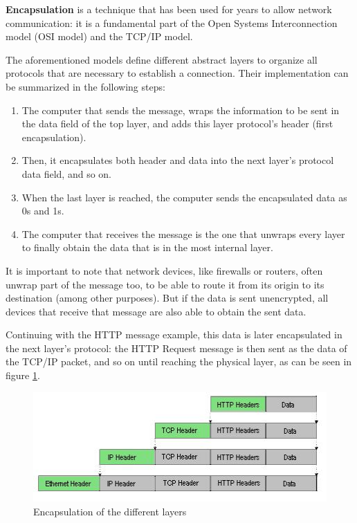 \textbf{Encapsulation} is a technique that has been used for years to allow network communication: it is a fundamental part of the Open Systems Interconnection model (OSI model) and the TCP/IP model. 

The aforementioned models define different abstract layers to organize all protocols that are necessary to establish a connection. Their implementation can be summarized in the following steps:
\begin{enumerate}
\item The computer that sends the message, wraps the information to be sent in the data field of the top layer, and adds this layer protocol's header (first encapsulation). 
\item Then, it encapsulates both header and data into the next layer's protocol data field, and so on. 
\item When the last layer is reached, the computer sends the encapsulated data as 0s and 1s.
\item The computer that receives the message is the one that unwraps every layer to finally obtain the data that is in the most internal layer.
\end{enumerate}

It is important to note that network devices, like firewalls or routers, often unwrap part of the message too, to be able to route it from its origin to its destination (among other purposes). But if the data is sent unencrypted, all devices that receive that message are also able to obtain the sent data.

Continuing with the HTTP message example, this data is later encapsulated in the next layer's protocol: the HTTP Request message is then sent as the data of the TCP/IP packet, and so on until reaching the physical layer, as can be seen in figure \ref{img:osilayers}.

\begin{figure}[!ht]
	\centering
	\includegraphics[width=13cm]{img/osilayers}
	\caption{Encapsulation of the different layers}
	\label{img:osilayers}
\end{figure}


